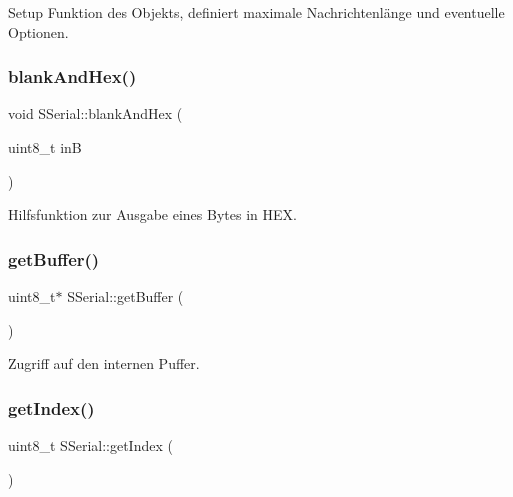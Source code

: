 Setup Funktion des Objekts, definiert maximale Nachrichtenlänge und eventuelle Optionen. 

\mbox{\label{class_s_serial_a25d8d6940a777f1ee9025d84686427f4}} 
\subsubsection{\texorpdfstring{blank\+And\+Hex()}{blankAndHex()}}
{\footnotesize\ttfamily void S\+Serial\+::blank\+And\+Hex (\begin{DoxyParamCaption}\item[{uint8\+\_\+t}]{inB }\end{DoxyParamCaption})\hspace{0.3cm}{\ttfamily [static]}}



Hilfsfunktion zur Ausgabe eines Bytes in H\+EX. 

\mbox{\label{class_s_serial_a51b04c6d668df7f059c05bbc20e6ce7d}} 
\subsubsection{\texorpdfstring{get\+Buffer()}{getBuffer()}}
{\footnotesize\ttfamily uint8\+\_\+t$\ast$ S\+Serial\+::get\+Buffer (\begin{DoxyParamCaption}{ }\end{DoxyParamCaption})\hspace{0.3cm}{\ttfamily [inline]}}



Zugriff auf den internen Puffer. 

\mbox{\label{class_s_serial_af905db964544b6acc41b6214f59b494b}} 
\subsubsection{\texorpdfstring{get\+Index()}{getIndex()}}
{\footnotesize\ttfamily uint8\+\_\+t S\+Serial\+::get\+Index (\begin{DoxyParamCaption}{ }\end{DoxyParamCaption})\hspace{0.3cm}{\ttfamily [inline]}}



